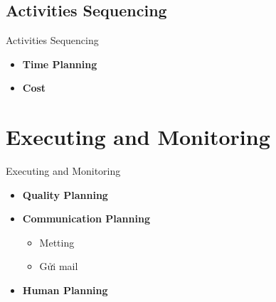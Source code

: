 \documentclass[compress]{beamer}
\begin{document}
\subsection{Activities Sequencing}
\begin{frame}{Activities Sequencing}
\begin{itemize}
\item \textbf{Time Planning}
\item \textbf{Cost}
\end{itemize}
\end{frame}
\section{Executing and Monitoring}
\begin{frame}{Executing and Monitoring}
\begin{itemize}
\item \textbf{Quality Planning}
\item \textbf{Communication Planning}
\begin{itemize}
\item Metting
\item Gửi mail
\end{itemize}
\item \textbf{Human Planning}
\end{itemize}
\end{frame}
\end{document}
